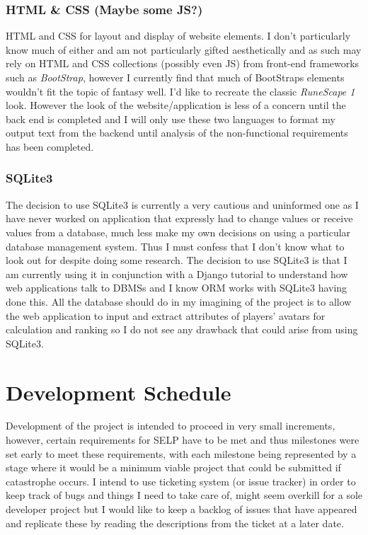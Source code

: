 \documentclass[11pt, a4paper]{article}
\begin{document}
\subsubsection{HTML \& CSS (Maybe some JS?)}
HTML and CSS for layout and display of website elements. I don't particularly know much of either and am not particularly gifted aesthetically and as such may rely on HTML and CSS collections (possibly even JS) from front-end frameworks such as \textit{BootStrap}, however I currently find that much of BootStraps elements wouldn't fit the topic of fantasy well. I'd like to recreate the classic \textit{RuneScape 1} look. However the look of the website/application is less of a concern until the back end is completed and I will only use these two languages to format my output text from the backend until analysis of the non-functional requirements has been completed.

\subsubsection{SQLite3}
The decision to use SQLite3 is currently a very cautious and uninformed one as I have never worked on application that expressly had to change values or receive values from a database, much less make my own decisions on using a particular database management system. Thus I must confess that I don't know what to look out for despite doing some research. The decision to use SQLite3 is that I am currently using it in conjunction with a Django tutorial to understand how web applications talk to DBMSs and I know ORM works with SQLite3 having done this. All the database should do in my imagining of the project is to allow the web application to input and extract attributes of players' avatars for calculation and ranking so I do not see any drawback that could arise from using SQLite3.

\section{Development Schedule}
Development of the project is intended to proceed in very small increments, however, certain requirements for SELP have to be met and thus milestones were set early to meet these requirements, with each milestone being represented by a stage where it would be a minimum viable project that could be submitted if catastrophe occurs. I intend to use   ticketing system (or issue tracker) in order to keep track of bugs and things I need to take care of, might seem overkill for a sole developer project but I would like to keep a backlog of issues that have appeared and replicate these by reading the descriptions from the ticket at a later date.
\end{document}
